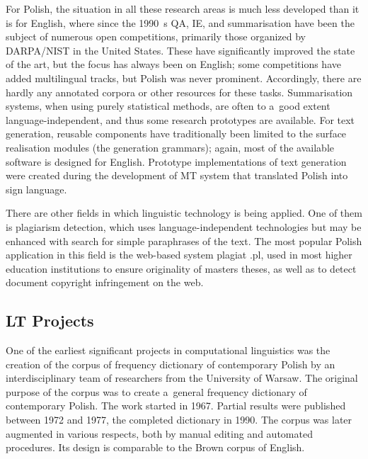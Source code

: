 \begin{multicols}{2}

For Polish, the situation in all these research areas is much less
developed than it is for English, where since the 1990~s QA, IE, and
summarisation have been the subject of numerous open competitions,
primarily those organized by DARPA/NIST in the United States. These
have significantly improved the state of the art, but the focus has
always been on English; some competitions have added multilingual
tracks, but Polish was never prominent. Accordingly, there are hardly
any annotated corpora or other resources for these tasks.
Summarisation systems, when using purely statistical methods, are
often to a~good extent language-independent, and thus some research
prototypes are available. For text generation, reusable components
have traditionally been limited to the surface realisation modules
(the {\textquotedbl}generation grammars{\textquotedbl}); again, most
of the available software is designed for English. Prototype
implementations of text generation were created during the development
of MT system that translated Polish into sign language. 

There are other fields in which linguistic technology is being
applied. One of them is plagiarism detection, which uses
language-independent technologies but may be enhanced with search for
simple paraphrases of the text. The most popular Polish application in
this field is the web-based system plagiat .pl, used in most higher
education institutions to ensure originality of
master{\textquotesingle}s theses, as well as to detect document
copyright infringement on the web. 

\vfill

\subsection[LT Projects]{LT Projects} 

One of the earliest significant projects in computational linguistics
was the creation of the corpus of frequency dictionary of contemporary
Polish by an interdisciplinary team of researchers from the University
of Warsaw. The original purpose of the corpus was to create a~general
frequency dictionary of contemporary Polish. The work started in 1967.
Partial results were published between 1972 and 1977, the completed
dictionary in 1990. The corpus was later augmented in various
respects, both by manual editing and automated procedures. Its design
is comparable to the Brown corpus of English. 


\end{multicols}
